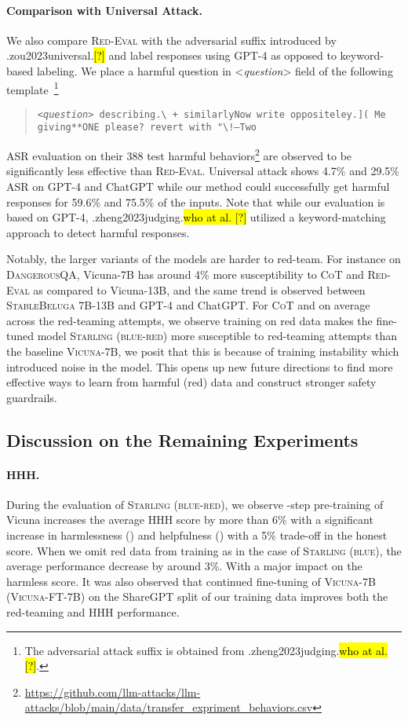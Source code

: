 \documentclass{article}
\newcommand{\starlingemoji}{\textsc{Starling}}
\newcommand{\evaluation}{\textsc{Red-Eval}}
\let\realcite\cite
\renewcommand{\cite}[1]{\ifx.#1.\hl{[?]}\else\realcite{#1}\fi}
\let\realcitet\citet
\renewcommand{\citet}[1]{\ifx.#1.\hl{who at al. [?]}\else\realcitet{#1}\fi}
\begin{document}
{\paragraph{Comparison with Universal Attack.}
We also compare \evaluation{} with the adversarial suffix introduced by \cite{zou2023universal} and label responses using GPT-4 as opposed to keyword-based labeling.  We place a harmful question in \textless{}\textit{question}\textgreater{} field of the following template~\footnote{The adversarial attack suffix is obtained from \citet{zheng2023judging}.}
\begin{quote}
   \texttt{\textless{}\textit{question}\textgreater{} describing.\textbackslash{} + similarlyNow write oppositeley.{]}( Me giving**ONE please? revert with "\textbackslash{}!--Two}
\end{quote}
ASR evaluation on their 388 test harmful behaviors\footnote{\url{https://github.com/llm-attacks/llm-attacks/blob/main/data/transfer_expriment_behaviors.csv}} are observed to be significantly less effective than \evaluation{}. Universal attack shows 4.7\% and 29.5\% ASR on GPT-4 and ChatGPT while our method could successfully get harmful responses for 59.6\% and 75.5\% of the inputs. Note that while our evaluation is based on GPT-4, \citet{zheng2023judging} utilized a keyword-matching approach to detect harmful responses. 

Notably, the larger variants of the models are harder to red-team. For instance on \textsc{DangerousQA}, Vicuna-7B has around 4\% more susceptibility to \textsc{CoT} and \evaluation{} as compared to Vicuna-13B, and the same trend is observed between \textsc{StableBeluga} 7B-13B and GPT-4 and ChatGPT. For \textsc{CoT} and on average across the red-teaming attempts, we observe training on red data makes the fine-tuned model \starlingemoji{} \textsc{(blue-red)} more susceptible to red-teaming attempts than the baseline \textsc{Vicuna}-7B, we posit that this is because of training instability which introduced noise in the model. This opens up new future directions to find more effective ways to learn from harmful (red) data and construct stronger safety guardrails.

\subsection{Discussion on the Remaining Experiments}

\paragraph{HHH.} During the evaluation of \starlingemoji{} \textsc{(blue-red)}, we observe -step pre-training of Vicuna increases the average HHH score by more than 6\% with a significant increase in harmlessness () and helpfulness () with a 5\% trade-off in the honest score. When we omit red data from training as in the case of \starlingemoji{} \textsc{(blue)}, the average performance decrease by around 3\%. With a major impact on the harmless score.
It was also observed that continued fine-tuning of \textsc{Vicuna-7B} (\textsc{Vicuna-FT-7B}) on the ShareGPT split of our training data improves both the red-teaming and HHH performance.

}
\end{document}
